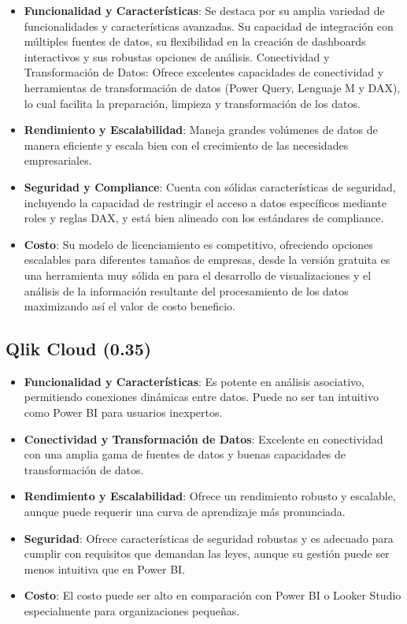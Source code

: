 \documentclass[
  11pt,
  bookmarksnumbered]{article}
\begin{document}
\begin{itemize}
\item
  \textbf{Funcionalidad y Características}: Se destaca por su amplia variedad de funcionalidades y características avanzadas. Su capacidad de integración con múltiples fuentes de datos, su flexibilidad en la creación de dashboards interactivos y sus robustas opciones de análisis.
  Conectividad y Transformación de Datos: Ofrece excelentes capacidades de conectividad y herramientas de transformación de datos (Power Query, Lenguaje M y DAX), lo cual facilita la preparación, limpieza y transformación de los datos.
\item
  \textbf{Rendimiento y Escalabilidad}: Maneja grandes volúmenes de datos de manera eficiente y escala bien con el crecimiento de las necesidades empresariales.
\item
  \textbf{Seguridad y Compliance}: Cuenta con sólidas características de seguridad, incluyendo la capacidad de restringir el acceso a datos específicos mediante roles y reglas DAX, y está bien alineado con los estándares de compliance.
\item
  \textbf{Costo}: Su modelo de licenciamiento es competitivo, ofreciendo opciones escalables para diferentes tamaños de empresas, desde la versión gratuita es una herramienta muy sólida en para el desarrollo de visualizaciones y el análisis de la información resultante del procesamiento de los datos maximizando así el valor de costo beneficio.
\end{itemize}

\hypertarget{qlik-cloud-0.35}{%
\subsection{Qlik Cloud (0.35)}\label{qlik-cloud-0.35}}

\begin{itemize}
\item
  \textbf{Funcionalidad y Características}: Es potente en análisis asociativo, permitiendo conexiones dinámicas entre datos. Puede no ser tan intuitivo como Power BI para usuarios inexpertos.
\item
  \textbf{Conectividad y Transformación de Datos}: Excelente en conectividad con una amplia gama de fuentes de datos y buenas capacidades de transformación de datos.
\item
  \textbf{Rendimiento y Escalabilidad}: Ofrece un rendimiento robusto y escalable, aunque puede requerir una curva de aprendizaje más pronunciada.
\item
  \textbf{Seguridad}: Ofrece características de seguridad robustas y es adecuado para cumplir con requisitos que demandan las leyes, aunque su gestión puede ser menos intuitiva que en Power BI.
\item
  \textbf{Costo}: El costo puede ser alto en comparación con Power BI o Looker Studio especialmente para organizaciones pequeñas.
\end{itemize}
\end{document}
